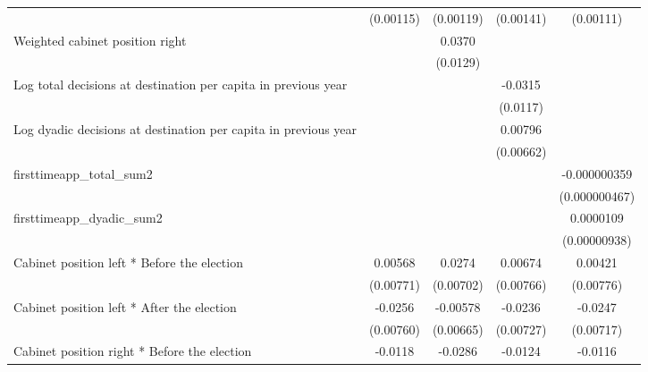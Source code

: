 \begin{table}[htbp]
\begin{tabular}{l*{4}{c}}
                    &   (0.00115)         &   (0.00119)         &   (0.00141)         &   (0.00111)         \\
[1em]
Weighted cabinet position right&                     &      0.0370\sym{**} &                     &                     \\
                    &                     &    (0.0129)         &                     &                     \\
[1em]
Log total decisions at destination per capita in previous year&                     &                     &     -0.0315\sym{**} &                     \\
                    &                     &                     &    (0.0117)         &                     \\
[1em]
Log dyadic decisions at destination per capita in previous year&                     &                     &     0.00796         &                     \\
                    &                     &                     &   (0.00662)         &                     \\
[1em]
firsttimeapp\_total\_sum2&                     &                     &                     &-0.000000359         \\
                    &                     &                     &                     &(0.000000467)         \\
[1em]
firsttimeapp\_dyadic\_sum2&                     &                     &                     &   0.0000109         \\
                    &                     &                     &                     &(0.00000938)         \\
[1em]
Cabinet position left * Before the election&     0.00568         &      0.0274\sym{***}&     0.00674         &     0.00421         \\
                    &   (0.00771)         &   (0.00702)         &   (0.00766)         &   (0.00776)         \\
[1em]
Cabinet position left * After the election&     -0.0256\sym{**} &    -0.00578         &     -0.0236\sym{**} &     -0.0247\sym{**} \\
                    &   (0.00760)         &   (0.00665)         &   (0.00727)         &   (0.00717)         \\
[1em]
Cabinet position right * Before the election&     -0.0118         &     -0.0286\sym{**} &     -0.0124         &     -0.0116         \\

\end{tabular}
\end{table}
